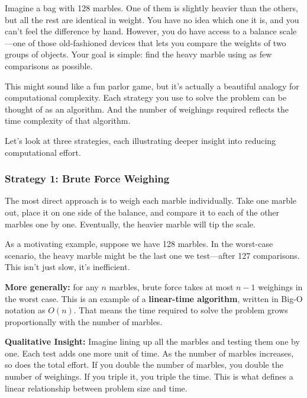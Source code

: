 Imagine a bag with 128 marbles. One of them is slightly heavier than the others, but all the rest are identical in weight. You have no idea which one it is, and you can’t feel the difference by hand. However, you do have access to a balance scale—one of those old-fashioned devices that lets you compare the weights of two groups of objects. Your goal is simple: find the heavy marble using as few comparisons as possible.

This might sound like a fun parlor game, but it’s actually a beautiful analogy for computational complexity. Each strategy you use to solve the problem can be thought of as an algorithm. And the number of weighings required reflects the time complexity of that algorithm.

Let’s look at three strategies, each illustrating deeper insight into reducing computational effort.

\subsubsection{Strategy 1: Brute Force Weighing}

The most direct approach is to weigh each marble individually. Take one marble out, place it on one side of the balance, and compare it to each of the other marbles one by one. Eventually, the heavier marble will tip the scale.

As a motivating example, suppose we have 128 marbles. In the worst-case scenario, the heavy marble might be the last one we test—after 127 comparisons. This isn't just slow, it’s inefficient.

\textbf{More generally:} for any \( n \) marbles, brute force takes at most \( n - 1 \) weighings in the worst case. This is an example of a \textbf{linear-time algorithm}, written in Big-O notation as \( O(n) \). That means the time required to solve the problem grows proportionally with the number of marbles.

\medskip

\noindent\textbf{Qualitative Insight:} Imagine lining up all the marbles and testing them one by one. Each test adds one more unit of time. As the number of marbles increases, so does the total effort. If you double the number of marbles, you double the number of weighings. If you triple it, you triple the time. This is what defines a linear relationship between problem size and time.

